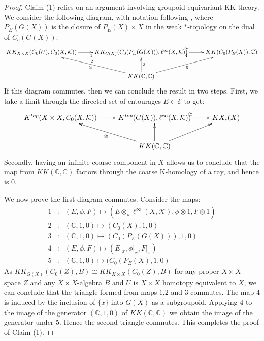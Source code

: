\documentclass[11pt]{amsart}
\theoremstyle{plain}
\theoremstyle{definition}%
\theoremstyle{remark}%
\begin{document}
{\begin{proof}
Claim (1) relies on an argument involving groupoid equivariant KK-theory. We consider the following diagram, with notation following \cite{MR1905840,MR1656031}, where $P_{E}(G(X))$ is the closure of $P_{E}(X)\times X$ in the weak $*$-topology on the dual of $C_{c}(G(X))$:
\begin{equation*}
\xymatrix{KK_{X\times X}(C_{0}(U),C_{0}(X,\mathcal{K})) \ar[r]_{1} & KK_{G(X)}(C_{0}(P_{E}(G(X))),\ell^{\infty}(X,\mathcal{K})) \ar[r]^{\cong}_{4}  & KK(C_{0}(P_{E}(X)),\mathbb{C}) \\
& KK(\mathbb{C},\mathbb{C}) \ar^{\cong}_{2}[lu]\ar[u]_{3}\ar[ur]_{5}&
}
\end{equation*}
If this diagram commutes, then we can conclude the result in two steps. First, we take a limit through the directed set of entourages $E \in \mathcal{E}$ to get:
\begin{equation*}
\xymatrix{K^{top}(X \times X, C_{0}(X,\mathcal{K})) \ar[r] & K^{top}(G(X)),\ell^{\infty}(X,\mathcal{K})) \ar[r]^{\cong}  & KX_{*}(X) \\
& KK(\mathbb{C},\mathbb{C}) \ar^{\cong}[lu]\ar[u]\ar[ur]&
}
\end{equation*}
Secondly, having an infinite coarse component in $X$ allows us to conclude that the map from $KK(\mathbb{C},\mathbb{C})$ factors through the coarse K-homology of a ray, and hence is $0$.

We now prove the first diagram commutes. Consider the maps:
\begin{eqnarray*}
1 & : & (E,\phi , F) \mapsto (E\otimes_{\rho}\ell^{\infty}(X,\mathcal{K}),\phi \otimes 1 , F \otimes 1)\\
2 & : & (\mathbb{C},1,0) \mapsto (C_{0}(X),1,0)\\
3 & : & (\mathbb{C},1,0) \mapsto (C_{0}(P_{E}(G(X))),1,0)\\
4 & : & (E,\phi , F) \mapsto (E|_{x},\phi|_{x},F|_{x})\\
5 & : & (\mathbb{C},1,0) \mapsto (C_{0}(P_{E}(X),1,0)
\end{eqnarray*}
As $KK_{G(X)}(C_{0}(Z),B) \cong KK_{X\times X}(C_{0}(Z),B)$ for any proper $X\times X$-space $Z$ and any $X \times X$-algebra $B$ and $U$ is $X\times X$ homotopy equivalent to $X$, we can conclude that the triangle formed from maps $1$,$2$ and $3$ commutes. The map $4$ is induced by the inclusion of $\lbrace x \rbrace$ into $G(X)$ as a subgroupoid. Applying $4$ to the image of the generator $(\mathbb{C},1,0)$ of $KK(\mathbb{C},\mathbb{C})$ we obtain the image of the generator under $5$. Hence the second triangle commutes. This completes the proof of Claim (1).


\end{proof}}
\end{document}
